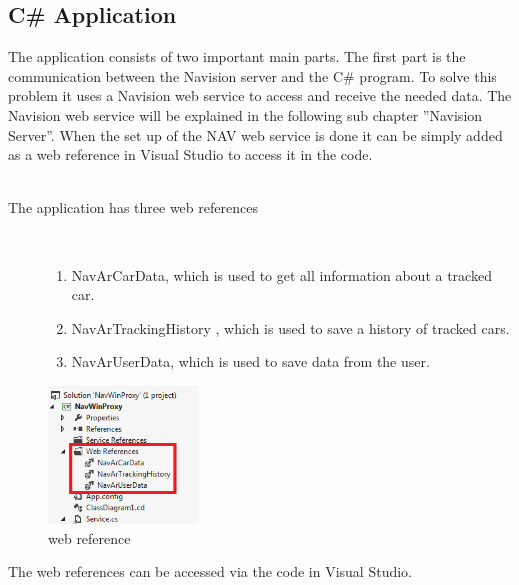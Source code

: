 \subsection{C\# Application}
The application consists of two important main parts. The first part is the communication between the Navision server and the C\# program. To solve this problem it uses a Navision web service to access and receive the needed data. The Navision web service will be explained in the following sub chapter ''Navision Server''. When the set up of the NAV web service is done it can be simply added as a web reference in Visual Studio to access it in the code.
\\\\
\begin{description}
   \item[The application has three web references]~\par
   \begin{enumerate}
      \item NavArCarData, which is used to get all information about a tracked car. 
      \item NavArTrackingHistory , which is used to save a history of tracked cars.
      \item	NavArUserData, which is used to save data from the user. 
   \end{enumerate}
\end{description}

\begin{figure}[htbp]
\centering
\includegraphics[width=40mm,height=\textheight,keepaspectratio]{graphics/webref.png}
\caption{web reference}
\end{figure}
The web references can be accessed via the code in Visual Studio.
\newpage
{}

